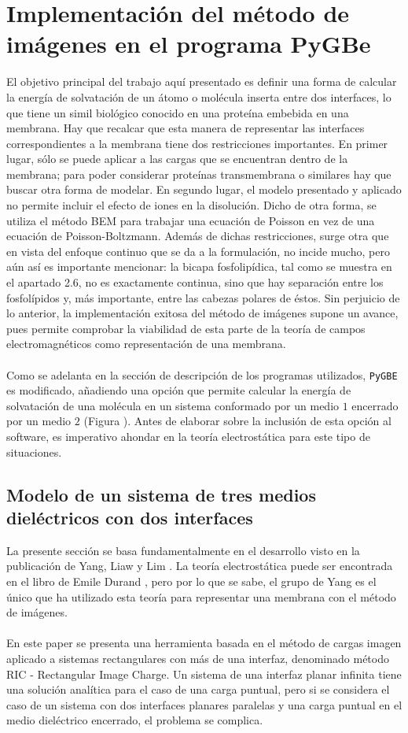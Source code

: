 \documentclass[12pt, oneside, numbers, spanish]{ezthesis}
\numberwithin{equation}{section}
\begin{document}
\section{Implementación del método de imágenes en el programa PyGBe}
El objetivo principal del trabajo aquí presentado es definir una forma de calcular la energía de solvatación de un átomo o molécula inserta entre dos interfaces, lo que tiene un simil biológico conocido en una proteína embebida en una membrana. Hay que recalcar que esta manera de representar las interfaces correspondientes a la membrana tiene dos restricciones importantes. En primer lugar, sólo se puede aplicar a las cargas que se encuentran dentro de la membrana; para poder considerar proteínas transmembrana o similares hay que buscar otra forma de modelar. En segundo lugar, el modelo presentado y aplicado no permite incluir el efecto de iones en la disolución. Dicho de otra forma, se utiliza el método BEM para trabajar una ecuación de Poisson en vez de una ecuación de Poisson-Boltzmann. Además de dichas restricciones, surge otra que en vista del enfoque continuo que se da a la formulación, no incide mucho, pero aún así es importante mencionar: la bicapa fosfolipídica, tal como se muestra en el apartado 2.6, no es exactamente continua, sino que hay separación entre los fosfolípidos y, más importante, entre las cabezas polares de éstos. Sin perjuicio de lo anterior, la implementación exitosa del método de imágenes supone un avance, pues permite comprobar la viabilidad de esta parte de la teoría de campos electromagnéticos como representación de una membrana.\\\\
Como se adelanta en la sección de descripción de los programas utilizados, \texttt{PyGBE} es modificado, añadiendo una opción que permite calcular la energía de solvatación de una molécula en un sistema conformado por un medio $1$ encerrado por un medio $2$ (Figura ). Antes de elaborar sobre la inclusión de esta opción al software, es imperativo ahondar en la teoría electrostática para este tipo de situaciones.

\subsection{Modelo de un sistema de tres medios dieléctricos con dos interfaces}
La presente sección se basa fundamentalmente en el desarrollo visto en la publicación de Yang, Liaw y Lim \cite{Pei-kun}. La teoría electrostática puede ser encontrada en el libro de Emile Durand \cite{Durand}, pero por lo que se sabe, el grupo de Yang es el único que ha utilizado esta teoría para representar una membrana con el método de imágenes.\\\\
En este paper se presenta una herramienta basada en el método de cargas imagen aplicado a sistemas rectangulares con más de una interfaz, denominado método RIC - Rectangular Image Charge. Un sistema de una interfaz planar infinita tiene una solución analítica para el caso de una carga puntual, pero si se considera el caso de un sistema con dos interfaces planares paralelas y una carga puntual en el medio dieléctrico encerrado, el problema se complica.
\end{document}
